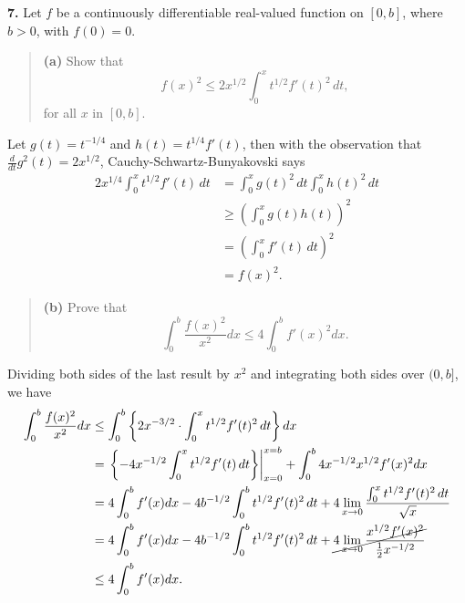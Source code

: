 \documentclass{homework}
\begin{document}
{\bf 7.} Let $f$ be a continuously differentiable real-valued function on $[0,b]$, where $b>0$, with $f(0) = 0$.  
\begin{quote}
  {\bf (a)} Show that 
  $$
    f(x)^2 \le 2x^{1/2}\int_0^xt^{1/2}f'(t)^2\,dt,
  $$
  for all $x$ in $[0,b]$.
\end{quote}

\begin{solution}
  Let $g(t) = t^{-1/4}$ and $h(t) = t^{1/4}f'(t)$, then with the observation that $\frac{d}{dt} g^2(t) = 2x^{1/2}$, Cauchy-Schwartz-Bunyakovski says
  \begin{align*}
    2x^{1/4}\int_0^x t^{1/2}f'(t)\,dt 
    &= \int_0^x g(t)^2\,dt \int_0^x h(t)^2\, dt \\
    &\ge \left(\int_0^x g(t) h(t) \right)^2\\
    &= \left(\int_0^x f'(t)\,dt\right)^2\\
    &= f(x)^2.
  \end{align*}
\end{solution}

\begin{quote}
  {\bf (b)} Prove that
  $$
    \int_0^b\frac{f(x)^2}{x^2}dx \le 4 \int_0^b f'(x)^2dx.
  $$
\end{quote}

\begin{solution}
  Dividing both sides of the last result by $x^2$ and integrating both sides over $(0,b]$, we have 
  \begin{align*}
    \int_0^b\frac{f(x)^2}{x^2}dx 
    &\le \int_0^b\left\{ 2x^{-3/2} \cdot \int_0^x t^{1/2}f'(t)^2\,dt\right\}dx\\
    &= \left.\left\{-4x^{-1/2} \int_0^x t^{1/2}f'(t)\,dt\right\}\right|_{x=0}^{x=b} + \int_0^b 4x^{-1/2} x^{1/2}f'(x)^2dx\\
    &= 4 \int_0^b f'(x)dx -4b^{-1/2} \int_0^b t^{1/2}f'(t)^2\,dt + 4\lim_{x\to0}\frac{\int_0^x t^{1/2}f'(t)^2\,dt}{\sqrt x}\\
    &= 4 \int_0^b f'(x)dx -4b^{-1/2} \int_0^b t^{1/2}f'(t)^2\,dt + \cancel{4\lim_{x\to0}\frac{x^{1/2}f'(x)^2}{\frac 12 x^{-1/2}}}\\
    &\le 4 \int_0^b f'(x)dx.
  \end{align*}
\end{solution}
\end{document}

